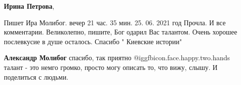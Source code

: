 \begin{itemize}
\textbf{Ирина Петрова}, 

Пишет Ира Молибог. вечер 21 час. 35 мин. 25. 06. 2021 год Прочла. И все
комментарии. Великолепно, пишите, Бог одарил Вас талантом. Очень хорошее
послевкусие в душе осталось. Спасибо " Киевские истории"

\begin{itemize} %
\textbf{Александр Молибог} спасибо, так приятно  @igg{fbicon.face.happy.two.hands}  талант - это немго громко, просто могу описать то, что вижу, слышу. И поделиться с людьми.
\end{itemize} %

\end{itemize} %
